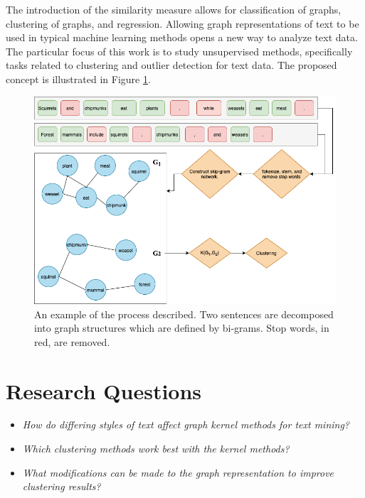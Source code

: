 \documentclass[11pt]{report}
\begin{document}
The introduction of the similarity measure allows for classification of graphs, clustering of graphs, and regression. Allowing graph representations of text to be used in typical machine learning methods opens a new way to analyze text data. The particular focus of this work is to study unsupervised methods, specifically tasks related to clustering and outlier detection for text data. The proposed concept is illustrated in Figure \ref{fig:diagram}. \\


\begin{figure}[ht]
\centering

\includegraphics[width = \textwidth]{../../Images/proposal_diagram.png}
\caption{An example of the process described. Two sentences are decomposed into graph structures which are defined by bi-grams. Stop words, in red, are removed.}
\label{fig:diagram}
\end{figure}


\section{Research Questions}

\begin{itemize}

	\item \textit{How do differing styles of text affect graph kernel methods for text mining?}
	\item \textit{Which clustering methods work best with the kernel methods?}
	\item \textit{What modifications can be made to the graph representation to improve clustering results?}

\end{itemize}
\end{document}
